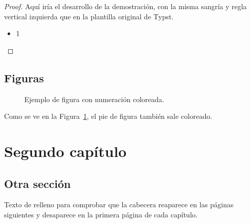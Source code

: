 	\begin{proof}
		Aquí iría el desarrollo de la demostración, con la misma sangría y
		regla vertical izquierda que en la plantilla original de Typst.
		\begin{itemize}
			\item 1
		\end{itemize}
		
	\end{proof}
	
	
	\section{Figuras}
	
	\begin{figure}[h]
		\centering
		\caption{Ejemplo de figura con numeración coloreada.}
		\label{fig:ejemplo}
	\end{figure}
	
	Como se ve en la Figura~\ref{fig:ejemplo}, el pie de figura también
	sale coloreado.
	
	\chapter{Segundo capítulo}
	
	\section{Otra sección}
	
	Texto de relleno para comprobar que la cabecera reaparece en las
	páginas siguientes y desaparece en la primera página de cada capítulo.
	
